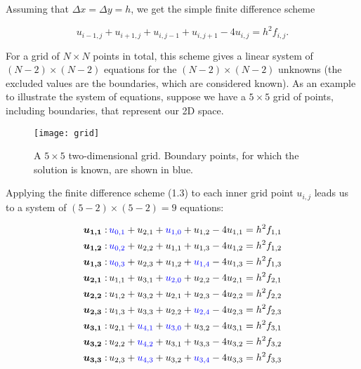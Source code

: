 \documentclass[11pt]{report}
\begin{document}
Assuming that $\Delta x = \Delta y = h$, we get the simple finite difference scheme

\begin{equation}
u_{i-1,j} + u_{i+1,j} + u_{i,j-1} + u_{i,j+1} - 4u_{i,j} = h^2 f_{i,j}.
\end{equation}

For a grid of $N \times N$ points in total, this scheme gives a linear system of $(N-2) \times (N-2)$ equations for the $(N-2) \times (N-2)$ unknowns (the excluded values are the boundaries, which are considered known). As an example to illustrate the system of equations, suppose we have a $5 \times 5$ grid of points, including boundaries, that represent our 2D space. 

\begin{figure}[h]
\centering
\texttt{[image: grid]}
\caption{A $5 \times 5$ two-dimensional grid. 
Boundary points, for which the solution is known, are shown in blue. }
\label{fig:Space grid 5x5}
\end{figure}

Applying the finite difference scheme (1.3) to each inner grid point $u_{i,j}$ leads us to a system of $(5-2) \times (5-2) = 9$ equations:

\begin{subequations}
\begin{align}
\bm{u_{1,1}}: 
\thinspace  & \textcolor{blue}{u_{0,1}} + u_{2,1} + \textcolor{blue}{u_{1,0}} + u_{1,2} - 4u_{1,1} = h^2 f_{1,1} \\
\bm{u_{1,2}}: 
\thinspace  & \textcolor{blue}{u_{0,2}} + u_{2,2} + u_{1,1} + u_{1,3} - 4u_{1,2} = h^2 f_{1,2} \\
\bm{u_{1,3}}: 
\thinspace  & \textcolor{blue}{u_{0,3}} + u_{2,3} + u_{1,2} + \textcolor{blue}{u_{1,4}} - 4u_{1,3} = h^2 f_{1,3} \\
\bm{u_{2,1}}: 
\thinspace  & u_{1,1} + u_{3,1} + \textcolor{blue}{u_{2,0}} + u_{2,2} - 4u_{2,1} = h^2 f_{2,1} \\
\bm{u_{2,2}}:
\thinspace  & u_{1,2} + u_{3,2} + u_{2,1} + u_{2,3} - 4u_{2,2} = h^2 f_{2,2} \\
\bm{u_{2,3}}: 
\thinspace  & u_{1,3} + u_{3,3} + u_{2,2} + \textcolor{blue}{u_{2,4}} - 4u_{2,3} = h^2 f_{2,3} \\
\bm{u_{3,1}}: 
\thinspace  & u_{2,1} + \textcolor{blue}{u_{4,1}} + \textcolor{blue}{u_{3,0}} + u_{3,2} - 4u_{3,1} = h^2 f_{3,1} \\
\bm{u_{3,2}}: 
\thinspace  & u_{2,2} + \textcolor{blue}{u_{4,2}} + u_{3,1} + u_{3,3} - 4u_{3,2} = h^2 f_{3,2} \\
\bm{u_{3,3}}: 
\thinspace  & u_{2,3} + \textcolor{blue}{u_{4,3}} + u_{3,2} + \textcolor{blue}{u_{3,4}} - 4u_{3,3} = h^2 f_{3,3}
\end{align}
\end{subequations}
\end{document}
